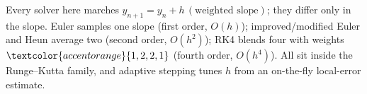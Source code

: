 \begin{conceptbox}
Every solver here marches $y_{n+1}=y_n+h\,(\text{weighted slope})$; they differ
only in the slope. \textcolor{accentorange}{Euler} samples one slope (first order,
$O(h)$); \textcolor{accentorange}{improved/modified Euler and Heun} average two
(second order, $O(h^{2})$); \textcolor{accentorange}{RK4} blends four with weights
$\textcolor{accentorange}{1,2,2,1}$ (fourth order, $O(h^{4})$). All sit inside the
\textcolor{accentorange}{Runge--Kutta family}, and \textcolor{accentorange}{adaptive
stepping} tunes $h$ from an on-the-fly local-error estimate.
\end{conceptbox}


